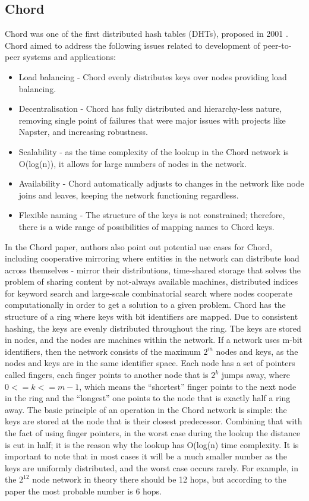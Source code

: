 \subsection{Chord}
Chord was one of the first distributed hash tables (DHTs), proposed in 2001 \cite{chord}. Chord aimed to address the following issues related to development of peer-to-peer systems and applications:
\begin{itemize}
    \item Load balancing - Chord evenly distributes keys over nodes providing load balancing.
    \item Decentralisation - Chord has fully distributed and hierarchy-less nature, removing single point of failures that were major issues with projects like Napster, and increasing robustness.
    \item Scalability - as the time complexity of the lookup in the Chord network is O(log(n)), it allows for large numbers of nodes in the network.
    \item Availability - Chord automatically adjusts to changes in the network like node joins and leaves, keeping the network functioning regardless.
    \item Flexible naming - The structure of the keys is not constrained; therefore, there is a wide range of possibilities of mapping names to Chord keys.
\end{itemize}
In the Chord paper, authors also point out potential use cases for Chord, including cooperative mirroring where entities in the network can distribute load across themselves - mirror their distributions, time-shared storage that solves the problem of sharing content by not-always available machines, distributed indices for keyword search and large-scale combinatorial search where nodes cooperate computationally in order to get a solution to a given problem.
Chord has the structure of a ring where keys with bit identifiers are mapped. Due to consistent hashing, the keys are evenly distributed throughout the ring. The keys are stored in nodes, and the nodes are machines within the network. If a network uses m-bit identifiers, then the network consists of the maximum $2^m$ nodes and keys, as the nodes and keys are in the same identifier space. Each node has a set of pointers called fingers, each finger points to another node that is $2^k$ jumps away, where $0 <= k <= m-1$, which means the “shortest” finger points to the next node in the ring and the “longest” one points to the node that is exactly half a ring away. The basic principle of an operation in the Chord network is simple: the keys are stored at the node that is their closest predecessor. Combining that with the fact of using finger pointers, in the worst case during the lookup the distance is cut in half; it is the reason why the lookup has O(log(n) time complexity. It is important to note that in most cases it will be a much smaller number as the keys are uniformly distributed, and the worst case occurs rarely. For example, in the $2^12$ node network in theory there should be 12 hops, but according to the paper the most probable number is 6 hops.


